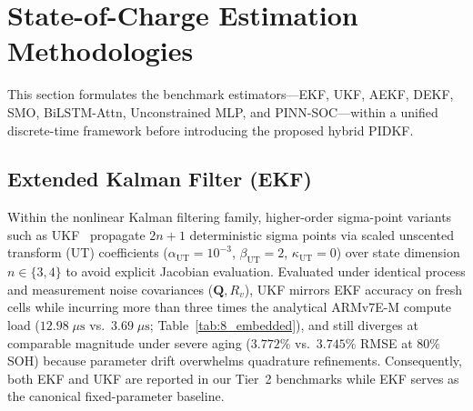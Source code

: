 \documentclass[11pt,a4paper]{article}
\providecommand{\upmu}{\mu}
\begin{document}
\section{State-of-Charge Estimation Methodologies}
This section formulates the benchmark estimators---EKF, UKF, AEKF, DEKF, SMO, BiLSTM-Attn, Unconstrained MLP, and PINN-SOC---within a unified discrete-time framework before introducing the proposed hybrid PIDKF.

\subsection{Extended Kalman Filter (EKF)}
Within the nonlinear Kalman filtering family, higher-order sigma-point variants such as UKF~\cite{Plett2006ukf,He2013ukf} propagate $2n+1$ deterministic sigma points via scaled unscented transform (UT) coefficients ($\alpha_{\text{UT}} = 10^{-3}$, $\beta_{\text{UT}} = 2$, $\kappa_{\text{UT}} = 0$) over state dimension $n \in \{3,4\}$ to avoid explicit Jacobian evaluation. Evaluated under identical process and measurement noise covariances ($\mathbf{Q}, R_v$), UKF mirrors EKF accuracy on fresh cells while incurring more than three times the analytical ARMv7E-M compute load ($12.98\;\upmu\mathrm{s}$ vs.\ $3.69\;\upmu\mathrm{s}$; Table~\ref{tab:8_embedded}), and still diverges at comparable magnitude under severe aging ($3.772\%$ vs.\ $3.745\%$ RMSE at $80\%$ SOH) because parameter drift overwhelms quadrature refinements. Consequently, both EKF and UKF are reported in our Tier~2 benchmarks while EKF serves as the canonical fixed-parameter baseline.
\end{document}

